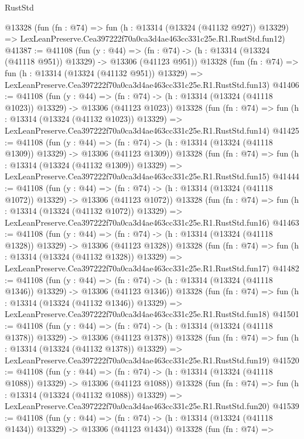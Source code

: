 \begin{lexlean}{RustStd}
\begin{coremodule}
    @13328
    (fun (fn : @74) =>
    fun (h : @13314 (@13324 (@41132 @927)) @13329) =>
    LexLeanPreserve.Cea397222f70a0ca3d4ae463cc331c25e.R1.RustStd.fun12)
@41387 := @41108
    (fun (y : @44) =>
    (fn : @74) -> (h : @13314 (@13324 (@41118 @951)) @13329) -> @13306 (@41123 @951))
    @13328
    (fun (fn : @74) =>
    fun (h : @13314 (@13324 (@41132 @951)) @13329) =>
    LexLeanPreserve.Cea397222f70a0ca3d4ae463cc331c25e.R1.RustStd.fun13)
@41406 := @41108
    (fun (y : @44) =>
    (fn : @74) -> (h : @13314 (@13324 (@41118 @1023)) @13329) -> @13306 (@41123 @1023))
    @13328
    (fun (fn : @74) =>
    fun (h : @13314 (@13324 (@41132 @1023)) @13329) =>
    LexLeanPreserve.Cea397222f70a0ca3d4ae463cc331c25e.R1.RustStd.fun14)
@41425 := @41108
    (fun (y : @44) =>
    (fn : @74) -> (h : @13314 (@13324 (@41118 @1309)) @13329) -> @13306 (@41123 @1309))
    @13328
    (fun (fn : @74) =>
    fun (h : @13314 (@13324 (@41132 @1309)) @13329) =>
    LexLeanPreserve.Cea397222f70a0ca3d4ae463cc331c25e.R1.RustStd.fun15)
@41444 := @41108
    (fun (y : @44) =>
    (fn : @74) -> (h : @13314 (@13324 (@41118 @1072)) @13329) -> @13306 (@41123 @1072))
    @13328
    (fun (fn : @74) =>
    fun (h : @13314 (@13324 (@41132 @1072)) @13329) =>
    LexLeanPreserve.Cea397222f70a0ca3d4ae463cc331c25e.R1.RustStd.fun16)
@41463 := @41108
    (fun (y : @44) =>
    (fn : @74) -> (h : @13314 (@13324 (@41118 @1328)) @13329) -> @13306 (@41123 @1328))
    @13328
    (fun (fn : @74) =>
    fun (h : @13314 (@13324 (@41132 @1328)) @13329) =>
    LexLeanPreserve.Cea397222f70a0ca3d4ae463cc331c25e.R1.RustStd.fun17)
@41482 := @41108
    (fun (y : @44) =>
    (fn : @74) -> (h : @13314 (@13324 (@41118 @1346)) @13329) -> @13306 (@41123 @1346))
    @13328
    (fun (fn : @74) =>
    fun (h : @13314 (@13324 (@41132 @1346)) @13329) =>
    LexLeanPreserve.Cea397222f70a0ca3d4ae463cc331c25e.R1.RustStd.fun18)
@41501 := @41108
    (fun (y : @44) =>
    (fn : @74) -> (h : @13314 (@13324 (@41118 @1378)) @13329) -> @13306 (@41123 @1378))
    @13328
    (fun (fn : @74) =>
    fun (h : @13314 (@13324 (@41132 @1378)) @13329) =>
    LexLeanPreserve.Cea397222f70a0ca3d4ae463cc331c25e.R1.RustStd.fun19)
@41520 := @41108
    (fun (y : @44) =>
    (fn : @74) -> (h : @13314 (@13324 (@41118 @1088)) @13329) -> @13306 (@41123 @1088))
    @13328
    (fun (fn : @74) =>
    fun (h : @13314 (@13324 (@41132 @1088)) @13329) =>
    LexLeanPreserve.Cea397222f70a0ca3d4ae463cc331c25e.R1.RustStd.fun20)
@41539 := @41108
    (fun (y : @44) =>
    (fn : @74) -> (h : @13314 (@13324 (@41118 @1434)) @13329) -> @13306 (@41123 @1434))
    @13328
    (fun (fn : @74) =>

\end{coremodule}
\end{lexlean}
